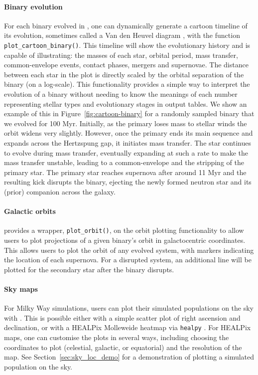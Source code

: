\documentclass[twocolumn, twocolappendix, oneside, linenumbers]{aastex631}
\newcommand{\codestyle}[1]{{\color{codecolour} \texttt{#1}}}
\begin{document}
\paragraph{Binary evolution} For each binary evolved in \cogsworth, one can dynamically generate a cartoon timeline of its evolution, sometimes called a Van den Heuvel diagram \citep{vandenheuvel:76}, with the function \codestyle{plot\_cartoon\_binary()}. This timeline will show the evolutionary history and is capable of illustrating: the masses of each star, orbital period, mass transfer, common-envelope events, contact phases, mergers and supernovae. The distance between each star in the plot is directly scaled by the orbital separation of the binary (on a log-scale). This functionality provides a simple way to interpret the evolution of a binary without needing to know the meanings of each number representing stellar types and evolutionary stages in \cosmic output tables. We show an example of this in Figure~\ref{fig:cartoon-binary} for a randomly sampled binary that we evolved for 100 Myr. Initially, as the primary loses mass to stellar winds the orbit widens very slightly. However, once the primary ends its main sequence and expands across the Hertzspung gap, it initiates mass transfer. The star continues to evolve during mass transfer, eventually expanding at such a rate to make the mass transfer unstable, leading to a common-envelope and the stripping of the primary star. The primary star reaches supernova after around 11 Myr and the resulting kick disrupts the binary, ejecting the newly formed neutron star and its (prior) companion across the galaxy.

\paragraph{Galactic orbits} \cogsworth provides a wrapper, \codestyle{plot\_orbit()}, on the \gala orbit plotting functionality to allow users to plot projections of a given binary's orbit in galactocentric coordinates. This allows users to plot the orbit of any evolved system, with markers indicating the location of each supernova. For a disrupted system, an additional line will be plotted for the secondary star after the binary disrupts.

\paragraph{Sky maps} For Milky Way simulations, users can plot their simulated populations on the sky with \cogsworth. This is possible either with a simple scatter plot of right ascension and declination, or with a HEALPix Molleweide heatmap via \texttt{healpy} \citep{Zonca2019, 2005ApJ...622..759G}. For HEALPix maps, one can customise the plots in several ways, including choosing the coordinates to plot (celestial, galactic, or equatorial) and the resolution of the map. See Section~\ref{sec:sky_loc_demo} for a demonstration of plotting a simulated population on the sky.
\end{document}
